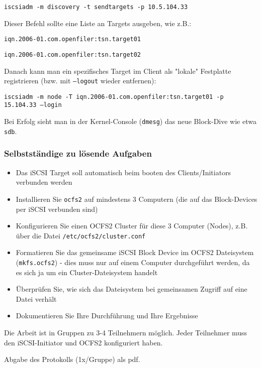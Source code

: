 \texttt{iscsiadm -m discovery -t sendtargets -p 10.5.104.33}

Dieser Befehl sollte eine Liste an Targets ausgeben, wie z.B.:

\texttt{iqn.2006-01.com.openfiler:tsn.target01}

\texttt{iqn.2006-01.com.openfiler:tsn.target02}

Danach kann man ein spezifisches Target im Client als "lokale" Festplatte registrieren (bzw. mit \texttt{--logout} wieder entfernen):

\texttt{iscsiadm -m node -T iqn.2006-01.com.openfiler:tsn.target01 -p 15.104.33 --login}

Bei Erfolg sieht man in der Kernel-Console (\texttt{dmesg}) das neue Block-Dive wie etwa \texttt{sdb}.

\subsubsection{Selbstständige zu lösende Aufgaben}
\begin{itemize}
	\item Das iSCSI Target soll automatisch beim booten des Clients/Initiators verbunden werden
	\item Installieren Sie \texttt{ocfs2} auf mindestens 3 Computern (die auf das Block-Devices per iSCSI verbunden sind)
	\item Konfigurieren Sie einen OCFS2 Cluster für diese 3 Computer (Nodes), z.B. über die Datei \texttt{/etc/ocfs2/cluster.conf}
	\item Formatieren Sie das gemeinsame iSCSI Block Device im OCFS2 Dateisystem (\texttt{mkfs.ocfs2}) - dies muss nur auf einem Computer durchgeführt werden, da es sich ja um ein Cluster-Dateisystem handelt
	\item Überprüfen Sie, wie sich das Dateisystem bei gemeinsamen Zugriff auf eine Datei verhält
	\item Dokumentieren Sie Ihre Durchführung und Ihre Ergebnisse
\end{itemize}
Die Arbeit ist in Gruppen zu 3-4 Teilnehmern möglich. Jeder Teilnehmer muss den iSCSI-Initiator und OCFS2 konfiguriert haben.

Abgabe des Protokolls (1x/Gruppe) als pdf.
\clearpage
